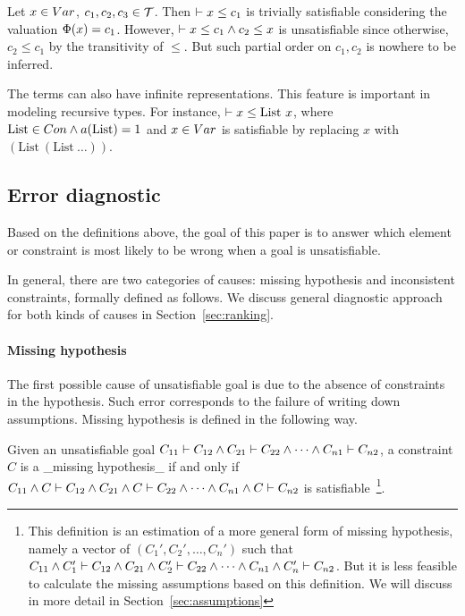Let $x\in Var$, $c_1, c_2, c_3\in \mathcal{T}$. Then $\vdash x \leq c_1$ is
trivially satisfiable considering the valuation $\Phi(x)=c_1$. However,
$\vdash x \leq c_1 \land c_2 \leq x$ is unsatisfiable since otherwise, $c_2
\leq c_1$ by the transitivity of $\leq$. But such partial order on $c_1, c_2$
is nowhere to be inferred.

The terms can also have infinite representations. This feature is
important in modeling recursive types. For instance, $\vdash x \leq
\text{List} \ x$, where $\text{List} \in Con \land a(\text{List})=1$ and
$x\in Var$ is satisfiable by replacing $x$ with $(\text{List} \
(\text{List} \ \dots))$.    

\subsection{Error diagnostic}

Based on the definitions above, the goal of this paper is to answer which
element or constraint is most likely to be wrong when a goal is unsatisfiable. 

In general, there are two categories of causes: missing hypothesis and
inconsistent constraints, formally defined as follows. We discuss
general diagnostic approach for both kinds of causes in
Section~\ref{sec:ranking}.

\paragraph{Missing hypothesis}

The first possible cause of unsatisfiable goal is due to the absence
of constraints in the hypothesis. Such error corresponds to the
failure of writing down assumptions. Missing hypothesis is defined in
the following way.

Given an unsatisfiable goal $C_{11} \vdash C_{12} \land C_{21} \vdash C_{22}
\land \dots \land C_{n1} \vdash C_{n2}$, a constraint $C$ is a _missing
hypothesis_ if and only if $C_{11} \land C \vdash C_{12} \land C_{21} \land C
\vdash C_{22} \land \dots \land C_{n1} \land C \vdash C_{n2}$ is
satisfiable~\footnote{This definition is an estimation of a more general form
of missing hypothesis, namely a vector of $(C_1', C_2', \dots, C_n')$ such that
$C_{11} \land C_1' \vdash C_{12} \land C_{21} \land C_2' \vdash C_{22} \land
\dots \land C_{n1} \land C_n' \vdash C_{n2}$. But it is less feasible to
calculate the missing assumptions based on this definition. We will discuss in
more detail in Section~\ref{sec:assumptions}}.

